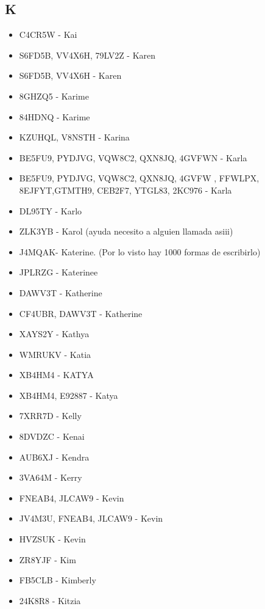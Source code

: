 \subsection*{K}
\begin{itemize}[leftmargin=*,nosep]
\item C4CR5W - Kai
\item S6FD5B, VV4X6H, 79LV2Z - Karen
\item S6FD5B, VV4X6H - Karen
\item 8GHZQ5 - Karime
\item 84HDNQ - Karime
\item KZUHQL, V8NSTH - Karina
\item BE5FU9, PYDJVG, VQW8C2, QXN8JQ, 4GVFWN - Karla
\item BE5FU9, PYDJVG, VQW8C2, QXN8JQ, 4GVFW , FFWLPX, 8EJFYT,GTMTH9, CEB2F7, YTGL83, 2KC976 - Karla
\item DL95TY - Karlo
\item ZLK3YB - Karol (ayuda necesito a alguien llamada asiii)
\item J4MQAK- Katerine. (Por lo visto hay 1000 formas de escribirlo)
\item JPLRZG - Katerinee
\item DAWV3T - Katherine
\item CF4UBR, DAWV3T - Katherine
\item XAYS2Y - Kathya
\item WMRUKV - Katia
\item XB4HM4 - KATYA
\item XB4HM4, E92887 - Katya
\item 7XRR7D - Kelly
\item 8DVDZC - Kenai
\item AUB6XJ - Kendra
\item 3VA64M - Kerry
\item FNEAB4, JLCAW9 - Kevin
\item JV4M3U, FNEAB4, JLCAW9 - Kevin
\item HVZSUK - Kevin
\item ZR8YJF - Kim
\item FB5CLB - Kimberly
\item 24K8R8 - Kitzia
\end{itemize}

